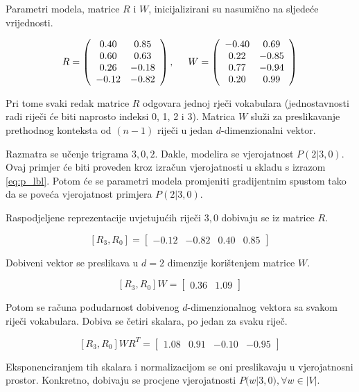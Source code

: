 \documentclass[times, utf8, diplomski, numeric]{fer}
\begin{document}
Parametri modela, matrice $R$ i $W$, inicijalizirani su nasumično na sljedeće vrijednosti.

\[ R = \left( \begin{array}{cc}
 0.40 &  0.85 \\
 0.60 &  0.63 \\
 0.26 & -0.18 \\
-0.12 & -0.82
\end{array} \right),
%
\hspace{0.5cm} W =
\left( \begin{array}{cc}
-0.40 &  0.69 \\
 0.22 & -0.85 \\
 0.77 & -0.94 \\
 0.20 &  0.99
 \end{array} \right)
\]

Pri tome svaki redak matrice $R$ odgovara jednoj rječi vokabulara (jednostavnosti radi riječi će biti naprosto indeksi 0, 1, 2 i 3). Matrica $W$ služi za preslikavanje prethodnog konteksta od $(n - 1)$ riječi u jedan $d$-dimenzionalni vektor.

Razmatra se učenje trigrama $3, 0, 2$. Dakle, modelira se vjerojatnost $P(2 | 3, 0)$. Ovaj primjer će biti proveden kroz izračun vjerojatnosti u skladu s izrazom \ref{eq:p_lbl}. Potom će se parametri modela promjeniti gradijentnim spustom tako da se poveća vjerojatnost primjera $P(2 | 3, 0)$.

Raspodjeljene reprezentacije uvjetujućih riječi $3, 0$ dobivaju se iz matrice $R$.

\[
\left[R_3, R_0\right] = 
\left[ \begin{array}{cccc} -0.12 & -0.82 & 0.40 & 0.85 \end{array} \right]
\]

Dobiveni vektor se preslikava u $d = 2$ dimenzije korištenjem matrice $W$.

\[
\left[R_3, R_0\right] W =
\left[ \begin{array}{cccc} 0.36 & 1.09 \end{array} \right]
\]

Potom se računa podudarnost dobivenog $d$-dimenzionalnog vektora sa svakom riječi vokabulara. Dobiva se četiri skalara, po jedan za svaku riječ.

\[
\left[R_3, R_0\right] W R^T= 
\left[ \begin{array}{cccc} 1.08 & 0.91 & -0.10 & -0.95 \end{array} \right]
\]

Eksponenciranjem tih skalara i normalizacijom se oni preslikavaju u vjerojatnosni prostor. Konkretno, dobivaju se procjene vjerojatnosti $P(w | 3, 0), \forall w \in |V|$.
\end{document}
